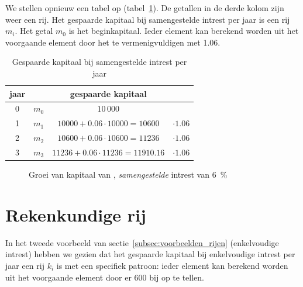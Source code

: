 We stellen opnieuw een tabel op (tabel~\ref{tbl:samengest_intrest}). De getallen in de derde kolom zijn weer een rij. Het gespaarde kapitaal bij samengestelde intrest per jaar is een rij $m_i$. Het getal $m_0$ is het beginkapitaal. Ieder element kan berekend worden uit het voorgaande element door het te vermenigvuldigen met \num{1.06}.

\begin{table}[htb]
    \centering
    \caption{Gespaarde kapitaal bij samengestelde intrest per jaar}
    \begin{tabular}{cccc}
    \toprule
    jaar & & gespaarde kapitaal & \\
    \midrule
    0  	& 	$m_0$		&	$10\,000$	&	\\
    1	&	$m_1$	&	$\num{10000}+\num{0,06}\cdot\num{10000}=\num{10600}$	&	$\cdot \num{1.06}$\\
    2	&	$m_2$	&	$\num{10600}+\num{0,06}\cdot\num{10600}=\num{11236}$	&	$\cdot \num{1.06}$\\
    3	&	$m_3$	&	$\num{11236}+\num{0,06}\cdot\num{11236}=\num{11910.16}$	&	$\cdot \num{1.06}$\\
    \bottomrule
     \end{tabular}
    \label{tbl:samengest_intrest}
\end{table}


\begin{figure}[htbp]
    \centering
{}
    \caption{Groei van kapitaal van , \emph{samengestelde} intrest van \SI{6}{\percent}}
    \label{fig:enkelvintrest} 
\end{figure}

\section{Rekenkundige rij}
\label{sec:RR}
In het tweede voorbeeld van sectie~\ref{subsec:voorbeelden_rijen} (enkelvoudige intrest) hebben we gezien dat 
het gespaarde kapitaal bij enkelvoudige intrest per jaar een rij $k_i$ is met een specifiek patroon:  ieder element kan berekend worden uit het voorgaande element door er 600 bij op te tellen.

